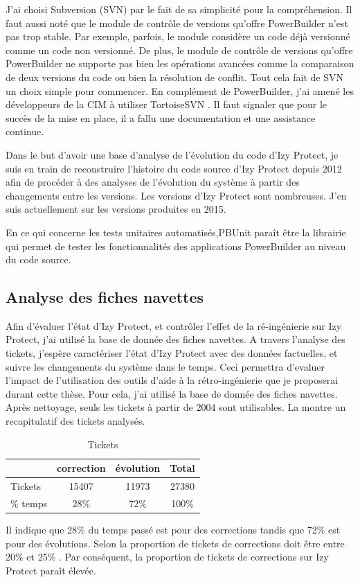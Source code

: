 \documentclass[a4paper]{article}
\begin{document}
J'ai choisi Subversion (SVN) \cite{svn} par le fait de sa simplicité pour la compréhension.
Il faut aussi noté que le module de contrôle de versions qu'offre PowerBuilder n'est pas trop stable. 
Par exemple, parfois, le module considère un code déjà versionné comme un code non versionné.
De plus, le module de contrôle de versions qu'offre PowerBuilder ne supporte pas bien les opérations avancées comme la comparaison de deux versions du code ou bien la résolution de conflit. 
Tout cela fait de SVN un choix simple pour commencer.
En complément de PowerBuilder, j'ai amené les développeurs de la CIM à utiliser TortoiseSVN \cite{clientSvn}.
Il faut signaler que pour le succès de la mise en place, il a fallu une documentation et une assistance continue.

Dans le but d'avoir une base d'analyse de l'évolution du code d'Izy Protect, je suis en train de  reconstruire l'histoire du code source d'Izy Protect depuis 2012 afin de procéder à des analyses de l'évolution du système à partir des changements entre les versions. 
Les versions d'Izy Protect sont nombreuses. J'en suis actuellement sur les versions produites en 2015.

En ce qui concerne les tests unitaires automatisés,PBUnit\cite{pbUnit}  paraît être la librairie qui permet de tester les fonctionnalités des applications PowerBuilder au niveau du code source. 


\subsection{Analyse des fiches navettes}
\label{sec:analyseDesFichesNavettes}
Afin d’évaluer l’état d’Izy Protect, et contrôler l’effet de la ré-ingénierie sur Izy Protect, j’ai utilisé la base de donnée des fiches navettes.
A travers l'analyse des tickets, j'espère  caractériser l'état d'Izy Protect avec des données factuelles, 
et suivre  les changements du système dans le temps.
Ceci permettra  d'evaluer l'impact de l'utilisation des outils d'aide à la rétro-ingénierie que je proposerai durant cette thèse.
Pour cela, j'ai utilisé la base de donnée des fiches navettes. 
Après nettoyage, seuls les tickets à partir de 2004 sont utilisables.
 La  montre un recapitulatif des tickets analysés.  
\begin{table}[htbp]
  \begin{center}
    \caption{Tickets}
    \label{tab:proportion}
    \begin{tabular}{| l | c |c|c|}
      \hline
       & correction  & évolution  & Total\\
      \hline
      Tickets &15407 & 11973  & 27380\\
      \hline
      $\%$ temps & $28\%$ & $72\%$ & 100\% \\
      \hline 
    \end{tabular}
  \end{center}  
\end{table}
Il indique que 28\% du temps passé est pour des corrections tandis que 72\% est  pour des évolutions.
Selon \citet{Pigo96a} la proportion de tickets de corrections doit être entre 20\% et 25\% . 
Par conséquent, la proportion de tickets de corrections sur Izy Protect paraît élevée.
\end{document}

